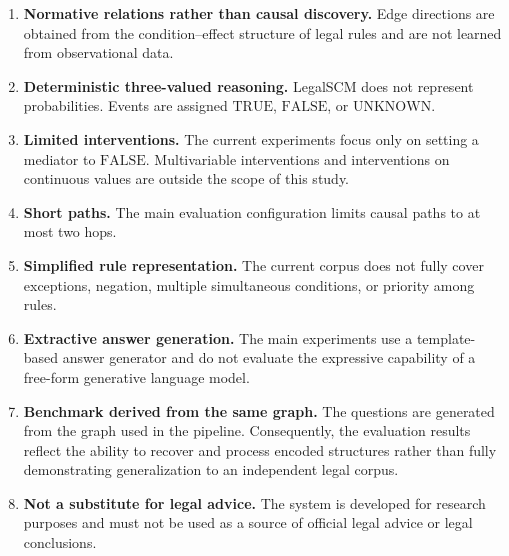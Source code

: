 \begin{enumerate}
    \item \textbf{Normative relations rather than causal discovery.}
    Edge directions are obtained from the condition--effect structure of
    legal rules and are not learned from observational data.

    \item \textbf{Deterministic three-valued reasoning.}
    LegalSCM does not represent probabilities. Events are assigned
    \(\mathrm{TRUE}\), \(\mathrm{FALSE}\), or \(\mathrm{UNKNOWN}\).

    \item \textbf{Limited interventions.}
    The current experiments focus only on setting a mediator to
    \(\mathrm{FALSE}\). Multivariable interventions and interventions on
    continuous values are outside the scope of this study.

    \item \textbf{Short paths.}
    The main evaluation configuration limits causal paths to at most two
    hops.

    \item \textbf{Simplified rule representation.}
    The current corpus does not fully cover exceptions, negation, multiple
    simultaneous conditions, or priority among rules.

    \item \textbf{Extractive answer generation.}
    The main experiments use a template-based answer generator and do not
    evaluate the expressive capability of a free-form generative language
    model.

    \item \textbf{Benchmark derived from the same graph.}
    The questions are generated from the graph used in the pipeline.
    Consequently, the evaluation results reflect the ability to recover and
    process encoded structures rather than fully demonstrating
    generalization to an independent legal corpus.

    \item \textbf{Not a substitute for legal advice.}
    The system is developed for research purposes and must not be used as a
    source of official legal advice or legal conclusions.
\end{enumerate}

